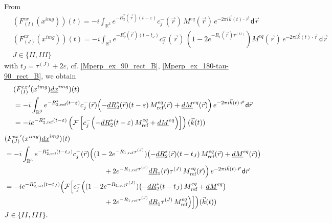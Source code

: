 \documentclass{ws-m3as}
\newcommand{\uld}[1]{\underline{d#1}}
\newcommand\taup{\varepsilon}
\newcommand\tauone{\tau^{(II)}}
\newcommand\tautwo{\tau^{(III)}}
\newcommand\tII{t_{II}}
\newcommand\tIII{t_{III}}
\begin{document}
From
\begin{equation}\label{F_ex_formulas}
\begin{aligned}
&(F_{(I)}^{ex}(x^{img}))(t)=
-i \int_{\mathbb{R}^3} e^{-R_2^*(\vec r)(t-\taup)} c^-_j(\vec r)\,M^{eq}(\vec r) \, e^{-2\pi i {\vec k}(t)\cdot{\vec r}}  \,\textsf{d}\vec r\\
&(F_{(J)}^{ex}(x^{img}))(t)=
-i \int_{\mathbb{R}^3} e^{-R_2^*(\vec r)(t-t_J)} c^-_j(\vec r)\,
(1-2e^{-R_1(\vec r)\tauone})M^{eq}(\vec r) \, e^{-2\pi i {\vec k}(t)\cdot{\vec r}}  \,\textsf{d}\vec r\\
&J\in\{II,III\}
\end{aligned}
\end{equation}
with 
$t_J=\tau^{(J)}+2\taup$,
cf. \eqref{Mperp_ex_90_rect_B}, \eqref{Mperp_ex_180-tau-90_rect_B}, we obtain 
\begin{equation}\label{F_ex_derivativeI}
\begin{aligned}
&({F_{(I)}^{ex}}'(x^{img})\uld{x}^{img})(t)\\
&=-i \int_{\mathbb{R}^3} e^{-R_{2,\text{ref}}^*(t-\taup)} c^-_j(\vec r)
\Bigl(-\uld{R}_2^*(\vec r)(t-\taup)\,M^{eq}_{\text{ref}}(\vec r)+\uld{M}^{eq}(\vec r)\Bigr) \, e^{-2\pi i {\vec k}(t)\cdot{\vec r}}  \,\textsf{d}\vec r\\
&=-i e^{-R_{2,\text{ref}}^*(t-\taup)} \left(\mathcal{F}\left[c^-_j
\Bigl(-\uld{R}_2^*(t-\taup)\,M^{eq}_{\text{ref}}+\uld{M}^{eq}\Bigr)\right]\right) ({\vec k}(t))
\end{aligned}
\end{equation}
\[
\begin{aligned}
&({F_{(J)}^{ex}}'(x^{img})\uld{x}^{img})(t)\\
&=-i \int_{\mathbb{R}^3} e^{-R_{2,\text{ref}}^*(t-t_J)} c^-_j(\vec r)
\Bigl((1-2e^{-R_{1,\text{ref}}\tau^{(J)}})\bigl(-\uld{R}_2^*(\vec r)(t-t_J)\,M^{eq}_{\text{ref}}(\vec r)+\uld{M}^{eq}(\vec r)\bigr)\\
&\hspace*{5cm}+2e^{-R_{1,\text{ref}}\tau^{(J)}}\uld{R}_1(\vec r)\tau^{(J)}\,M^{eq}_{\text{ref}}(\vec r) \Bigr) \, e^{-2\pi i {\vec k}(t)\cdot{\vec r}}  \,\textsf{d}\vec r\\
&=-i e^{-R_{2,\text{ref}}^*(t-t_J)} \Bigl(\mathcal{F}\Bigl[c^-_j
\Bigl((1-2e^{-R_{1,\text{ref}}\tau^{(J)}})\bigl(-\uld{R}_2^*(t-t_J)\,M^{eq}_{\text{ref}}+\uld{M}^{eq}\bigr)\\
&\hspace*{5cm}
+2e^{-R_{1,\text{ref}}\tau^{(J)}}\uld{R}_1\tau^{(J)}\,M^{eq}_{\text{ref}} \Bigr)\Bigr]\Bigr) ({\vec k}(t))
\\
&J\in\{II,III\}.
\end{aligned}
\]
\end{document}
